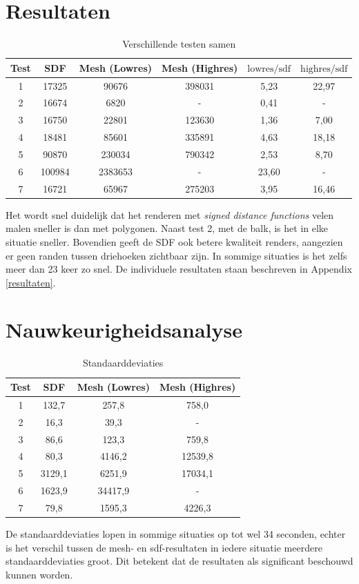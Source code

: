 \documentclass[12pt, a4paper]{article}
\begin{document}
\section{Resultaten}

\begin{table}[H]
\centering
\begin{tabular}{| c | c c c || c c |}
	\hline
	Test & SDF & Mesh (Lowres) & Mesh (Highres) & $\text{lowres}/\text{sdf}$ & $\text{highres}/\text{sdf}$ \\
	\hline
	1 & 17325 & 90676 & 398031 & 5,23 & 22,97 \\
	2 & 16674 & 6820 & - & 0,41 & - \\
	3 & 16750 & 22801 & 123630 & 1,36 & 7,00 \\
	4 & 18481 & 85601 & 335891 & 4,63 & 18,18 \\
	5 & 90870 & 230034 & 790342 & 2,53 & 8,70 \\
	6 & 100984 & 2383653 & - & 23,60 & - \\
	7 & 16721 & 65967 & 275203 & 3,95 & 16,46 \\
	\hline
\end{tabular}
\caption{Verschillende testen samen}
\end{table}

Het wordt snel duidelijk dat het renderen met \textit{signed distance functions} velen malen sneller is dan met polygonen. Naast test 2, met de balk, is het in elke situatie sneller. Bovendien geeft de SDF ook betere kwaliteit renders, aangezien er geen randen tussen driehoeken zichtbaar zijn. In sommige situaties is het zelfs meer dan 23 keer zo snel. De individuele resultaten staan beschreven in Appendix \ref{resultaten}.
\section{Nauwkeurigheidsanalyse}
\begin{table}[H]
	\centering
	\begin{tabular}{| c | c c c |}
		\hline
		Test & SDF & Mesh (Lowres) & Mesh (Highres) \\
		\hline
		1 & 132,7 & 257,8 & 758,0\\
		2 & 16,3 & 39,3 & - \\
		3 & 86,6 & 123,3 & 759,8  \\
		4 & 80,3 & 4146,2 & 12539,8 \\
		5 & 3129,1 & 6251,9 & 17034,1 \\
		6 & 1623,9 & 34417,9 & - \\
		7 & 79,8 & 1595,3 & 4226,3 \\
		\hline
	\end{tabular}
	\caption{Standaarddeviaties}
\end{table}
De standaarddeviaties lopen in sommige situaties op tot wel 34 seconden, echter is het verschil tussen de mesh- en sdf-resultaten in iedere situatie meerdere standaarddeviaties groot. Dit betekent dat de resultaten als significant beschouwd kunnen worden. 
\end{document}
